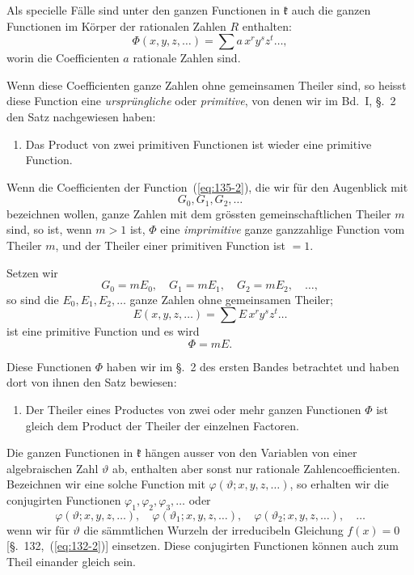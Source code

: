 \documentclass[12pt,a4paper]{article}
\theoremstyle{definition}
\begin{document}
Als specielle Fälle sind unter den ganzen Functionen in $\mathfrak{k}$ auch die ganzen Functionen im Körper der rationalen Zahlen $R$ enthalten:
\begin{equation}\label{eq:135-2}
\Phi(x,y,z,\dots) = \sum a\,x^r y^s z^t \dots,
\end{equation}
worin die Coefficienten $a$ rationale Zahlen sind.

Wenn diese Coefficienten ganze Zahlen ohne gemeinsamen Theiler sind, so heisst diese Function eine \emph{ursprüngliche} oder \emph{primitive}, von denen wir im Bd.~I, \S.~2 den Satz nachgewiesen haben:

\begin{enumerate}[label=\arabic*., resume]
\item Das Product von zwei primitiven Functionen ist wieder eine primitive Function.
\end{enumerate}

Wenn die Coefficienten der Function~(\ref{eq:135-2}), die wir für den Augenblick mit
\[
G_0, G_1, G_2, \dots
\]
bezeichnen wollen, ganze Zahlen mit dem grössten gemeinschaftlichen Theiler $m$ sind, so ist, wenn $m>1$ ist, $\Phi$ eine \emph{imprimitive} ganze ganzzahlige Function vom Theiler $m$, und der Theiler einer primitiven Function ist $=1$.

Setzen wir
\begin{equation}\label{eq:135-3}
G_0 = mE_0,\quad G_1 = mE_1,\quad G_2 = mE_2,\quad \dots,
\end{equation}
so sind die $E_0,E_1,E_2,\dots$ ganze Zahlen ohne gemeinsamen Theiler;
\begin{equation}\label{eq:135-4}
E(x,y,z,\dots) = \sum E\,x^r y^s z^t \dots
\end{equation}
ist eine primitive Function und es wird
\[
\Phi = mE.
\]

Diese Functionen $\Phi$ haben wir im \S.~2 des ersten Bandes betrachtet und haben dort von ihnen den Satz bewiesen:

\begin{enumerate}[label=\arabic*., resume]
\item Der Theiler eines Productes von zwei oder mehr ganzen Functionen $\Phi$ ist gleich dem Product der Theiler der einzelnen Factoren.
\end{enumerate}

Die ganzen Functionen in $\mathfrak{k}$ hängen ausser von den Variablen von einer algebraischen Zahl $\vartheta$ ab, enthalten aber sonst nur rationale Zahlencoefficienten. Bezeichnen wir eine solche Function mit $\varphi(\vartheta;x,y,z,\dots)$, so erhalten wir die conjugirten Functionen $\varphi_1,\varphi_2,\varphi_3,\dots$ oder
\begin{equation}\label{eq:135-5}
\varphi(\vartheta;x,y,z,\dots),\quad
\varphi(\vartheta_1;x,y,z,\dots),\quad
\varphi(\vartheta_2;x,y,z,\dots),\quad \dots
\end{equation}
wenn wir für $\vartheta$ die sämmtlichen Wurzeln der irreducibeln Gleichung $f(x)=0$ [\S.~132,~(\ref{eq:132-2})] einsetzen. Diese conjugirten Functionen können auch zum Theil einander gleich sein.
\end{document}
